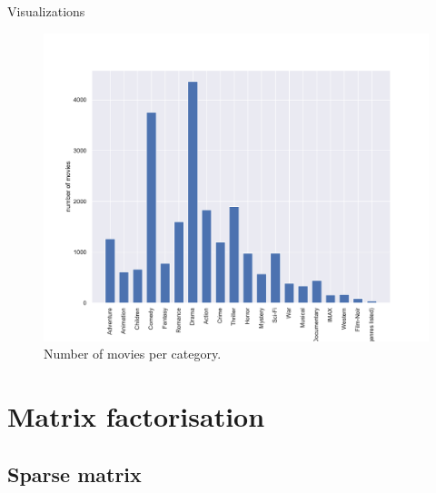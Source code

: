 \documentclass[unknownkeysallowed]{beamer}
\begin{document}
\begin{frame}{Visualizations}
    \begin{figure}[H]
\centering
  \includegraphics[scale=0.35]{./images/genres.pdf}
  \caption{Number of movies per category.}
  \label{fig:category}
\end{figure}
\end{frame}


\section{Matrix factorisation}
\label{sec:matrix}

\subsection{Sparse matrix}
\label{sec:sparse}
\end{document}
